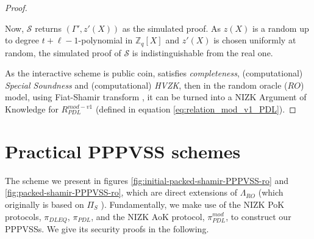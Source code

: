 \begin{proof}
\begin{itemize}
      Now, $\mathcal{S}$ returns $(\Gamma',z'(X))$ as the simulated proof. As $z(X)$ is a random 
      up to degree $t+\ell-1$-polynomial in $\mathbb{Z}_q[X]$ and $z'(X)$ is chosen uniformly at random, 
      the simulated proof of $\mathcal{S}$ is indistinguishable from the real one.
  \end{itemize}
  As the interactive scheme is public coin, satisfies \textit{completeness}, (computational) \textit{Special Soundness} 
  and (computational) \textit{HVZK}, then in the random oracle ($RO$) model, using Fiat-Shamir transform \cite{10.1007/3-540-47721-7_12}, 
  it can be turned into a NIZK Argument of Knowledge for $R_{PDL}^{mod-v1}$ (defined in equation \ref{eq:relation_mod_v1_PDL}).
\end{proof}


\section{Practical PPPVSS schemes}

The scheme we present in figures \ref{fig:initial-packed-shamir-PPPVSS-ro} and \ref{fig:packed-shamir-PPPVSS-ro}, which are direct extensions of $\Lambda_{RO}$ \cite{cryptoeprint:2025/576} 
(which originally is based on $\Pi_S$ \cite{cryptoeprint:2023/1669}). Fundamentally, we make use of the NIZK 
PoK protocols, $\pi_{DLEQ}$, $\pi_{PDL}$, and the NIZK AoK protocol, $\pi_{PDL}^{mod}$, to construct our PPPVSSs. We give its security proofs in the following. 





